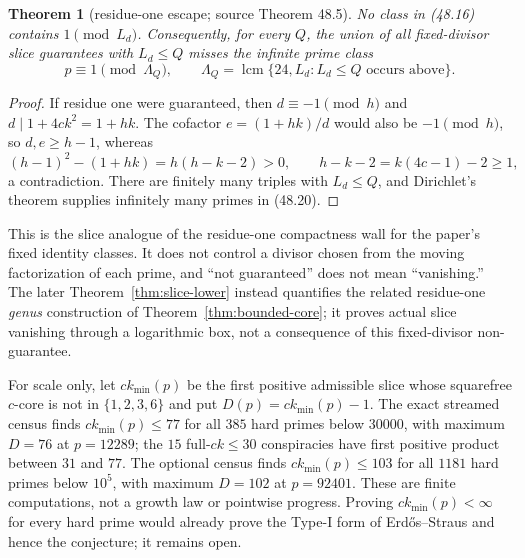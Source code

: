 \documentclass[10pt,reqno]{amsart}
\newtheorem{theorem}{Theorem}[section]
\theoremstyle{definition}
\newcommand{\lcm}{\operatorname {lcm}}
\newcommand{\1}{\mathbf 1}
\begin{document}
\begin{theorem}[residue-one escape; source Theorem 48.5]
\label{thm:slice-residue-one}
No class in (48.16) contains $1\pmod {L_d}$.  Consequently, for every
$Q$, the union of all fixed-divisor slice guarantees with $L_d\leq Q$
misses the infinite prime class
\begin{equation}\tag{48.20}
 p\equiv1\pmod {\Lambda_Q},\qquad
 \Lambda_Q=\lcm\{24,L_d:L_d\leq Q\text{ occurs above}\}.
\end{equation}
\end{theorem}
\begin{proof}
If residue one were guaranteed, then $d\equiv-1\pmod h$ and
$d\mid1+4ck^2=1+hk$.  The cofactor $e=(1+hk)/d$ would also be
$-1\pmod h$, so $d,e\geq h-1$, whereas
\[
 (h-1)^2-(1+hk)=h(h-k-2)>0,
 \qquad h-k-2=k(4c-1)-2\geq1,
\]
a contradiction.  There are finitely many triples with $L_d\leq Q$, and
Dirichlet's theorem supplies infinitely many primes in (48.20).
\end{proof}
This is the slice analogue of the residue-one compactness wall for the
paper's fixed identity classes.  It does not control a divisor chosen from
the moving factorization of each prime, and ``not guaranteed'' does not mean
``vanishing.''  The later Theorem~\ref{thm:slice-lower} instead quantifies
the related residue-one \emph{genus} construction of
Theorem~\ref{thm:bounded-core}; it proves actual slice vanishing through a
logarithmic box, not a consequence of this fixed-divisor non-guarantee.

For scale only, let $ck_{\min}(p)$ be the first positive admissible slice
whose squarefree $c$-core is not in $\{1,2,3,6\}$ and put
$D(p)=ck_{\min}(p)-1$.  The exact streamed census finds
$ck_{\min}(p)\leq77$ for all $385$ hard primes below $30000$, with maximum
$D=76$ at $p=12289$; the $15$ full-$ck\leq30$ conspiracies have first
positive product between $31$ and $77$.  The optional census finds
$ck_{\min}(p)\leq103$ for all $1181$ hard primes below $10^5$, with maximum
$D=102$ at $p=92401$.  These are finite computations, not a growth law or
pointwise progress.  Proving $ck_{\min}(p)<\infty$ for every hard prime
would already prove the Type-I form of Erd\H{o}s--Straus and hence the
conjecture; it remains open.
\end{document}
